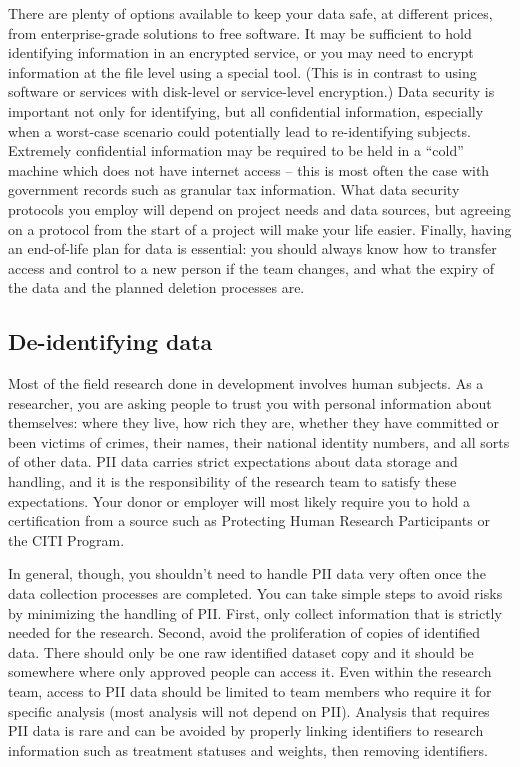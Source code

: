 There are plenty of options available to keep your data safe,
at different prices, from enterprise-grade solutions to free software.
It may be sufficient to hold identifying information in an encrypted service,
or you may need to encrypt information at the file level using a special tool.
(This is in contrast to using software or services with disk-level or service-level encryption.)
Data security is important not only for identifying, but all confidential information,
especially when a worst-case scenario could potentially lead to re-identifying subjects.
Extremely confidential information may be required to be held in a ``cold'' machine
which does not have internet access -- this is most often the case with
government records such as granular tax information.
What data security protocols you employ will depend on project needs and data sources,
but agreeing on a protocol from the start of a project will make your life easier.
Finally, having an end-of-life plan for data is essential:
you should always know how to transfer access and control to a new person if the team changes,
and what the expiry of the data and the planned deletion processes are.

\subsection{De-identifying data}

Most of the field research done in development involves human subjects.
As a researcher, you are asking people to trust you with personal information about themselves:
where they live, how rich they are, whether they have committed or been victims of crimes,
their names, their national identity numbers, and all sorts of other data.
PII data carries strict expectations about data storage and handling,
and it is the responsibility of the research team to satisfy these expectations.
Your donor or employer will most likely require you to hold a certification from a source
such as Protecting Human Research Participants
or the CITI Program.

In general, though, you shouldn't need to handle PII data very often
once the data collection processes are completed.
You can take simple steps to avoid risks by minimizing the handling of PII.
First, only collect information that is strictly needed for the research.
Second, avoid the proliferation of copies of identified data.
There should only be one raw identified dataset copy
and it should be somewhere where only approved people can access it.
Even within the research team, 
access to PII data should be limited to team members who require it for specific analysis 
(most analysis will not depend on PII).
Analysis that requires PII data is rare
and can be avoided by properly linking identifiers to research information
such as treatment statuses and weights, then removing identifiers.

